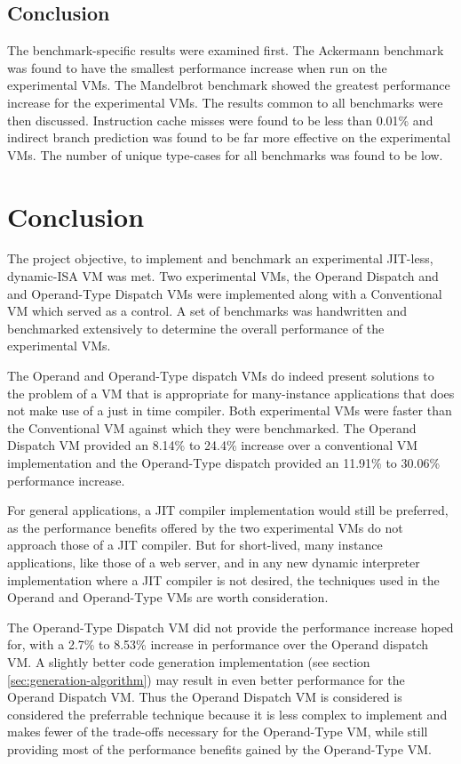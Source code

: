 \documentclass[english,a4paper,12pt]{report}
\begin{document}
\section{Conclusion}
The benchmark-specific results were examined first. The Ackermann
benchmark was found to have the smallest performance increase when run
on the experimental VMs. The Mandelbrot benchmark showed the greatest
performance increase for the experimental VMs. The results common to
all benchmarks were then discussed. Instruction cache misses were
found to be less than 0.01\% and indirect branch prediction was found
to be far more effective on the experimental VMs. The number of unique
type-cases for all benchmarks was found to be low. 

\chapter{Conclusion}

The project objective, to implement and benchmark an experimental
JIT-less, dynamic-ISA VM was met. Two experimental VMs, the Operand
Dispatch and and Operand-Type Dispatch VMs were implemented along with
a Conventional VM which served as a control. A set of benchmarks was
handwritten and benchmarked extensively to determine the overall
performance of the experimental VMs.

The Operand and Operand-Type dispatch VMs do indeed present solutions
to the problem of a VM that is appropriate for many-instance
applications that does not make use of a just in time compiler. Both
experimental VMs were faster than the Conventional VM against which
they were benchmarked. The Operand Dispatch VM provided an 8.14\% to
24.4\% increase over a conventional VM implementation and the
Operand-Type dispatch provided an 11.91\% to 30.06\% performance
increase.

For general applications, a JIT compiler implementation would still be
preferred, as the performance benefits offered by the two experimental
VMs do not approach those of a JIT compiler. But for short-lived, many
instance applications, like those of a web server, and in any new
dynamic interpreter implementation where a JIT compiler is not
desired, the techniques used in the Operand and Operand-Type VMs are
worth consideration.

The Operand-Type Dispatch VM did not provide the performance increase
hoped for, with a 2.7\% to 8.53\% increase in performance over the
Operand dispatch VM. A slightly better code generation implementation
(see section \ref{sec:generation-algorithm}) may result in even better
performance for the Operand Dispatch VM. Thus the Operand Dispatch VM
is considered is considered the preferrable technique because it is
less complex to implement and makes fewer of the trade-offs necessary
for the Operand-Type VM, while still providing most of the performance
benefits gained by the Operand-Type VM.
\end{document}
